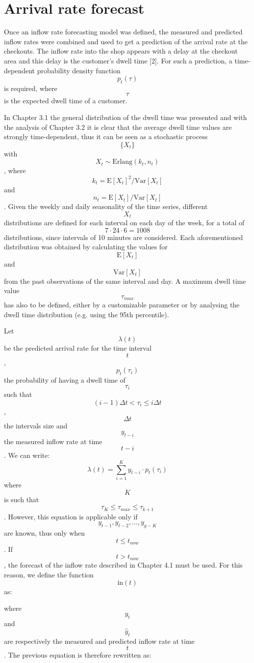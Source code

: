 \section{Arrival rate forecast}
\label{sec:arrival_rate_forecast}
Once an inflow rate forecasting model was defined, the measured and predicted inflow rates were combined and used to get a prediction of the arrival rate at the checkouts. The inflow rate into the shop appears with a delay at the checkout area and this delay is the customer's dwell time [2]. For such a prediction, a time-dependent probability density function $$ p_t(\tau) $$ is required, where $$ \tau $$ is the expected dwell time of a customer.

In Chapter 3.1 the general distribution of the dwell time was presented and with the analysis of Chapter 3.2 it is clear that the average dwell time values are strongly time-dependent, thus it can be seen as a stochastic process $$ \{ X_t \} $$ with $$ X_t \sim \text{Erlang}(k_t, n_t) $$, where $$ k_t = \text{E}[X_t]^2 / \text{Var}[X_t] $$ and $$ n_t =  \text{E}[X_t] / \text{Var}[X_t] $$. Given the weekly and daily seasonality of the time series, different $$ X_t $$ distributions are defined for each interval on each day of the week, for a total of $$ 7 \cdot 24 \cdot 6 = 1008 $$ distributions, since intervals of 10 minutes are considered. Each aforementioned distribution was obtained by calculating the values for $$ \text{E}[X_t] $$ and $$ \text{Var}[X_t] $$ from the past observations of the same interval and day. A maximum dwell time value $$ \tau_{max} $$ has also to be defined, either by a customizable parameter or by analysing the dwell time distribution (e.g. using the 95th percentile).

Let $$ \lambda(t) $$ be the predicted arrival rate for the time interval $$ t $$, $$ p_t(\tau_i) $$ the probability of having a dwell time of $$ \tau_i $$ such that $$ (i-1) \Delta t < \tau_i \leq i \Delta t $$, $$ \Delta t $$ the intervals size and $$ y_{t-i} $$ the measured inflow rate at time $$ t-i $$. We can write:
$$ \lambda(t) = \sum_{i=1}^{K} y_{t-i} \cdot p_t(\tau_i) $$
where $$ K $$ is such that $$ \tau_K \leq \tau_{max} \leq \tau_{k+1}  $$. However, this equation is applicable only if $$ y_{t-1}, y_{t-2}, ..., y_{y-K} $$ are known, thus only when $$ t \leq t_{now} $$. If $$ t > t_{now} $$, the forecast of the inflow rate described in Chapter 4.1 must be used. For this reason, we define the function $$ \text{in}(t) $$ as:


where $$ y_t $$ and $$ \hat{y}_t $$ are respectively the measured and predicted inflow rate at time $$ t $$. The previous equation is therefore rewritten as:

